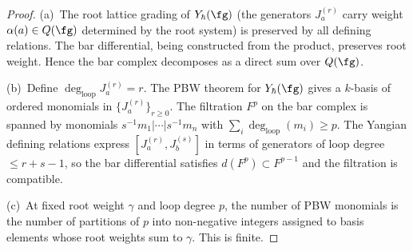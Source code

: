 \begin{proof}
(a)~The root lattice grading of $Y_\hbar(\fg)$ (the generators $J^{(r)}_a$ carry weight
$\alpha(a) \in Q(\fg)$ determined by the root
system) is preserved by all defining relations. The bar
differential, being constructed from the product, preserves root
weight. Hence the bar complex decomposes as a direct sum over
$Q(\fg)$.

(b)~Define $\deg_{\mathrm{loop}} J^{(r)}_a = r$. The PBW
theorem for $Y_\hbar(\fg)$ \cite{Drinfeld85,molev-yangians} gives
a $k$-basis of ordered monomials in $\{J^{(r)}_a\}_{r \ge 0}$.
The filtration $F^p$ on the bar complex is spanned by monomials
$s^{-1}m_1 | \cdots | s^{-1}m_n$ with
$\sum_i \deg_{\mathrm{loop}}(m_i) \ge p$. The Yangian defining
relations express $[J^{(r)}_a, J^{(s)}_b]$ in terms of generators
of loop degree $\le r + s - 1$, so the bar differential satisfies
$d(F^p) \subset F^{p-1}$ and the filtration is compatible.

(c)~At fixed root weight $\gamma$ and loop degree $p$, the number
of PBW monomials is the number of partitions of $p$ into
non-negative integers assigned to basis elements whose root weights
sum to $\gamma$. This is finite.
\end{proof}

